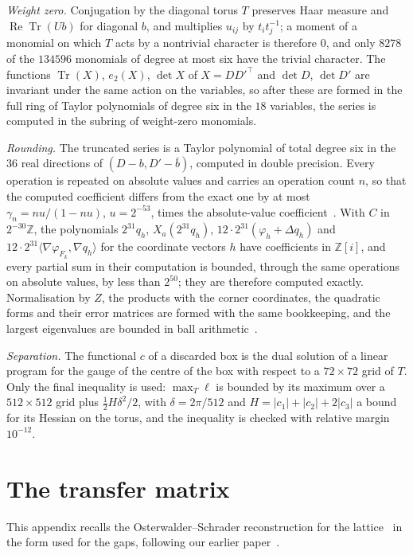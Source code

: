 \documentclass[aps,prd,twocolumn,superscriptaddress,nofootinbib,longbibliography,floatfix,amsmath,amssymb,10pt]{revtex4-2}
\theoremstyle{definition}
\theoremstyle{remark}
\newcommand{\Z}{\mathbb{Z}}
\newcommand{\Tr}{\operatorname{Tr}}
\newcommand{\ReTr}{\operatorname{Re}\operatorname{Tr}}
\newcommand{\ip}[2]{\langle #1,#2\rangle}
\begin{document}
\emph{Weight zero.} Conjugation by the diagonal torus $T$ preserves Haar measure
and $\ReTr(Ub)$ for diagonal $b$, and multiplies $u_{ij}$ by $t_it_j^{-1}$; a
moment of a monomial on which $T$ acts by a nontrivial character is therefore
$0$, and only $8278$ of the $134596$ monomials of degree at most six have the
trivial character. The functions $\Tr(X)$, $e_2(X)$, $\det X$ of $X=DD'^\top$
and $\det D$, $\det D'$ are invariant under the same action on the variables,
so after these are formed in the full ring of Taylor polynomials of degree six
in the $18$ variables, the series is computed in the subring of weight-zero
monomials.

\emph{Rounding.} The truncated series is a Taylor polynomial of total degree
six in the $36$ real directions of $(D-b,D'-\bar b)$, computed in double
precision. Every operation is repeated on absolute values and carries an
operation count $n$, so that the computed coefficient differs from the
exact one by at most $\gamma_n=nu/(1-nu)$, $u=2^{-53}$, times the
absolute-value coefficient~\cite[Sec.~3.1]{Hig02}. With $C$ in $2^{-30}\Z$,
the polynomials $2^{31}q_h$, $X_a(2^{31}q_h)$,
$12\cdot2^{31}(\varphi_h+\Delta q_h)$ and $12\cdot2^{31}\ip{\nabla\varphi_{F_k}}
{\nabla q_h}$ for the coordinate vectors $h$ have coefficients in $\Z[i]$, and
every partial sum in their computation is bounded, through the same
operations on absolute values, by less than $2^{50}$; they are therefore
computed exactly. Normalisation by $Z$, the products with the corner
coordinates, the quadratic forms and their error matrices are formed with the
same bookkeeping, and the largest eigenvalues are bounded in ball
arithmetic~\cite{Joh17}.

\emph{Separation.} The functional $c$ of a discarded box is the dual solution
of a linear program for the gauge of the centre of the box with respect to a
$72\times72$ grid of $T$. Only the final inequality is used: $\max_T\ell$ is
bounded by its maximum over a $512\times512$ grid plus $\frac12H\delta^2/2$, with
$\delta=2\pi/512$ and $H=|c_1|+|c_2|+2|c_3|$ a bound for its Hessian on the
torus, and the inequality is checked with relative margin $10^{-12}$.



\section{The transfer matrix}\label{app:transfer}

This appendix recalls the Osterwalder--Schrader reconstruction for the
lattice~\cite{OS73,OS75,OSei78} in the form used for the gaps, following our
earlier paper~\cite{BB26a}.
\end{document}
